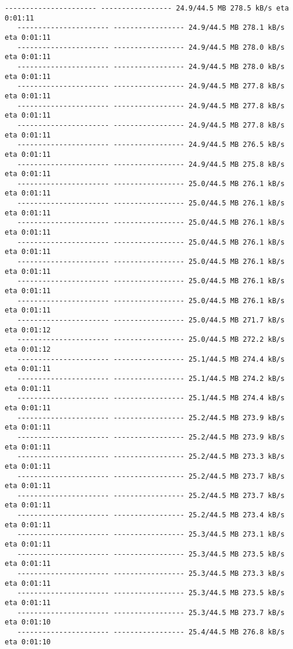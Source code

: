 \documentclass[11pt]{article}
\begin{document}
\begin{Verbatim}[commandchars=\\\{\}]
   ---------------------- ----------------- 24.9/44.5 MB 278.5 kB/s eta 0:01:11
   ---------------------- ----------------- 24.9/44.5 MB 278.1 kB/s eta 0:01:11
   ---------------------- ----------------- 24.9/44.5 MB 278.0 kB/s eta 0:01:11
   ---------------------- ----------------- 24.9/44.5 MB 278.0 kB/s eta 0:01:11
   ---------------------- ----------------- 24.9/44.5 MB 277.8 kB/s eta 0:01:11
   ---------------------- ----------------- 24.9/44.5 MB 277.8 kB/s eta 0:01:11
   ---------------------- ----------------- 24.9/44.5 MB 277.8 kB/s eta 0:01:11
   ---------------------- ----------------- 24.9/44.5 MB 276.5 kB/s eta 0:01:11
   ---------------------- ----------------- 24.9/44.5 MB 275.8 kB/s eta 0:01:11
   ---------------------- ----------------- 25.0/44.5 MB 276.1 kB/s eta 0:01:11
   ---------------------- ----------------- 25.0/44.5 MB 276.1 kB/s eta 0:01:11
   ---------------------- ----------------- 25.0/44.5 MB 276.1 kB/s eta 0:01:11
   ---------------------- ----------------- 25.0/44.5 MB 276.1 kB/s eta 0:01:11
   ---------------------- ----------------- 25.0/44.5 MB 276.1 kB/s eta 0:01:11
   ---------------------- ----------------- 25.0/44.5 MB 276.1 kB/s eta 0:01:11
   ---------------------- ----------------- 25.0/44.5 MB 276.1 kB/s eta 0:01:11
   ---------------------- ----------------- 25.0/44.5 MB 271.7 kB/s eta 0:01:12
   ---------------------- ----------------- 25.0/44.5 MB 272.2 kB/s eta 0:01:12
   ---------------------- ----------------- 25.1/44.5 MB 274.4 kB/s eta 0:01:11
   ---------------------- ----------------- 25.1/44.5 MB 274.2 kB/s eta 0:01:11
   ---------------------- ----------------- 25.1/44.5 MB 274.4 kB/s eta 0:01:11
   ---------------------- ----------------- 25.2/44.5 MB 273.9 kB/s eta 0:01:11
   ---------------------- ----------------- 25.2/44.5 MB 273.9 kB/s eta 0:01:11
   ---------------------- ----------------- 25.2/44.5 MB 273.3 kB/s eta 0:01:11
   ---------------------- ----------------- 25.2/44.5 MB 273.7 kB/s eta 0:01:11
   ---------------------- ----------------- 25.2/44.5 MB 273.7 kB/s eta 0:01:11
   ---------------------- ----------------- 25.2/44.5 MB 273.4 kB/s eta 0:01:11
   ---------------------- ----------------- 25.3/44.5 MB 273.1 kB/s eta 0:01:11
   ---------------------- ----------------- 25.3/44.5 MB 273.5 kB/s eta 0:01:11
   ---------------------- ----------------- 25.3/44.5 MB 273.3 kB/s eta 0:01:11
   ---------------------- ----------------- 25.3/44.5 MB 273.5 kB/s eta 0:01:11
   ---------------------- ----------------- 25.3/44.5 MB 273.7 kB/s eta 0:01:10
   ---------------------- ----------------- 25.4/44.5 MB 276.8 kB/s eta 0:01:10

\end{Verbatim}
\end{document}

